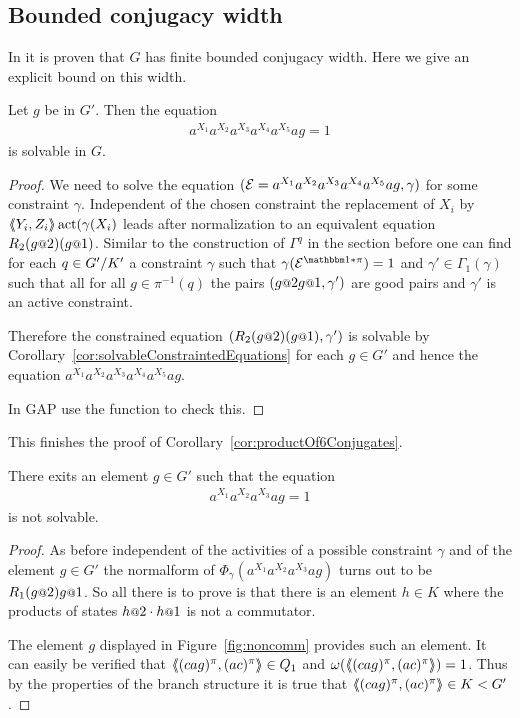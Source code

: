\documentclass[a4paper,11pt]{amsart}
\begin{document}
\subsection{Bounded conjugacy width}
In \cite{Fink:Conjugacy_growth} it is proven that $G$ has finite bounded conjugacy width. Here we give an explicit bound 
on this width.
\begin{pro}
 Let $g$ be in $G'$. Then the equation 
 \begin{align*}
  a^{X_1}a^{X_2}a^{X_3}a^{X_4}a^{X_5}ag=1
 \end{align*}
is solvable in $G$. 
\end{pro}
\begin{proof}
We need to solve the equation $(\mathcal{E}=a^{X_1}a^{X_2}a^{X_3}a^{X_4}a^{X_5}ag,\gamma)$ for
some constraint $\gamma$. Independent of the chosen constraint the replacement of
$X_i$ by $\langle\negthickspace\langle Y_i,Z_i\rangle\negthickspace\rangle\operatorname{act}(\gamma(X_i)$ leads after normalization to an equivalent equation 
$R_2(g\at{2})(g\at{1})$. Similar to the construction of $\Gamma^q$ in the section
before one can find for each $q\in{G'/K'}$ a constraint $\gamma$ such that
$\gamma(\eq{E}^{\id*\pi})=1$ and $\gamma'\in\Gamma_1(\gamma)$ such that all for all 
$g\in\pi^{-1}(q)$ the pairs $(g\at{2}g\at{1},\gamma')$ are good pairs and $\gamma'$ is 
an active constraint.

Therefore the constrained equation $(R_2(g\at{2})(g\at{1}),\gamma')$ is solvable
by Corollary~\ref{cor:solvableConstraintedEquations}
for each $g\in G'$ and hence the equation $a^{X_1}a^{X_2}a^{X_3}a^{X_4}a^{X_5}ag$.

In GAP use the function  to check this.
\end{proof}	
This finishes the proof of Corollary~\ref{cor:productOf6Conjugates}.
\begin{lem}
 There exits an element $g\in G'$ such that the equation 
 \begin{align*}
  a^{X_1}a^{X_2}a^{X_3}ag=1
 \end{align*}
 is not solvable.
\end{lem}
\begin{proof}
As before independent of the activities of a possible constraint $\gamma$ and of the element $g\in G'$
the normalform of $\Phi_\gamma(a^{X_1}a^{X_2}a^{X_3}ag)$ turns out to
be $R_1(g\at{2}) g\at{1}$. So all there is to prove is that there is an element $h\in K$
where the products of states $h\at{2}\cdot h\at{1}$ is not a commutator.

The element $g$ displayed in Figure~\ref{fig:noncomm} provides such an element. It can easily be verified 
that $\langle\negthickspace\langle(cag)^\pi,(ac)^\pi\rangle\negthickspace\rangle\in Q_1$ and $\omega(\langle\negthickspace\langle(cag)^\pi,(ac)^\pi\rangle\negthickspace\rangle)=1$. Thus by
the properties of the branch structure it is true that $\langle\negthickspace\langle(cag)^\pi,(ac)^\pi\rangle\negthickspace\rangle\in K<G'$. 
\end{proof}
\end{document}
